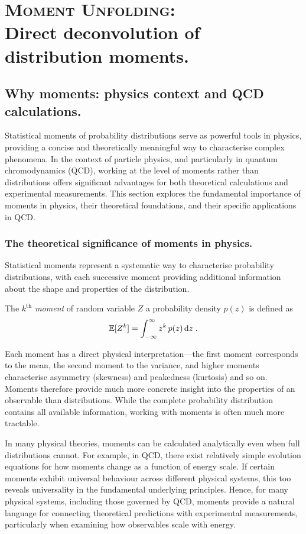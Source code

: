 \chapter[\textsc{Moment Unfolding}.]{\textsc{Moment Unfolding}:\\Direct deconvolution of distribution moments.}
\label{chap:moment-unfolding}
\chapterminitoc
\section{Why moments: physics context and QCD calculations.}
\sectionminitoc
    Statistical moments of probability distributions serve as powerful tools in physics, providing a concise and theoretically meaningful way to characterise complex phenomena.
    In the context of particle physics, and particularly in quantum chromodynamics (QCD), working at the level of moments rather than distributions offers significant advantages for both theoretical calculations and experimental measurements.
    This section explores the fundamental importance of moments in physics, their theoretical foundations, and their specific applications in QCD.
    \subsection{The theoretical significance of moments in physics.}
        Statistical moments represent a systematic way to characterise probability distributions, with each successive moment providing additional information about the shape and properties of the distribution.

        \begin{definition}
        The \emph{$k^{\text{th}}$ moment} of random variable \(Z\) a probability density $p(z)$ is defined as
        \[
            \operatorname{\mathbb{E}} [Z^k] = \int_{-\infty}^{\infty} z^k\, p(z)\, \dd z\;.
        \]
        \end{definition}
        Each moment has a direct physical interpretation---the first moment corresponds to the mean, the second moment to the variance, and higher moments characterise asymmetry (skewness) and peakedness (kurtosis) and so on.
        Moments therefore provide much more concrete insight into the properties of an observable than distributions.
        While the complete probability distribution contains all available information, working with moments is often much more tractable.
        
        In many physical theories, moments can be calculated analytically even when full distributions cannot.
        For example, in QCD, there exist relatively simple evolution equations for how moments change as a function of energy scale.
        If certain moments exhibit universal behaviour across different physical systems, this too reveals universality in the fundamental underlying principles.
        Hence, for many physical systems, including those governed by QCD, moments provide a natural language for connecting theoretical predictions with experimental measurements, particularly when examining how observables scale with energy.
        
